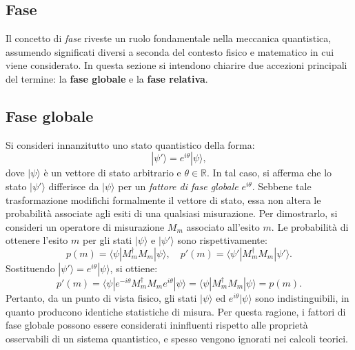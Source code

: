 \documentclass[a4paper,12pt]{report}
\theoremstyle{plain}
\begin{document}
\subsection{Fase}
Il concetto di \emph{fase} riveste un ruolo fondamentale nella meccanica quantistica, assumendo significati diversi a seconda del contesto fisico e matematico in cui viene considerato. In questa sezione si intendono chiarire due accezioni principali del termine: la \textbf{fase globale} e la \textbf{fase relativa}.
\subsection*{Fase globale}
Si consideri innanzitutto uno stato quantistico della forma:
\[
|\psi'\rangle = e^{i\theta}|\psi\rangle,
\]
dove \(|\psi\rangle\) è un vettore di stato arbitrario e \(\theta \in \mathbb{R}\). In tal caso, si afferma che lo stato \(|\psi'\rangle\) differisce da \(|\psi\rangle\) per un \emph{fattore di fase globale} \(e^{i\theta}\). Sebbene tale trasformazione modifichi formalmente il vettore di stato, essa non altera le probabilità associate agli esiti di una qualsiasi misurazione. Per dimostrarlo, si consideri un operatore di misurazione \(M_m\) associato all'esito \(m\). Le probabilità di ottenere l'esito \(m\) per gli stati \(|\psi\rangle\) e \(|\psi'\rangle\) sono rispettivamente:
\[
p(m) = \langle \psi | M_m^\dagger M_m | \psi \rangle, \quad
p'(m) = \langle \psi' | M_m^\dagger M_m | \psi' \rangle.
\]
Sostituendo \(|\psi'\rangle = e^{i\theta}|\psi\rangle\), si ottiene:
\[
p'(m) = \langle \psi | e^{-i\theta} M_m^\dagger M_m e^{i\theta} | \psi \rangle = \langle \psi | M_m^\dagger M_m | \psi \rangle = p(m).
\]
Pertanto, da un punto di vista fisico, gli stati \(|\psi\rangle\) ed \(e^{i\theta}|\psi\rangle\) sono indistinguibili, in quanto producono identiche statistiche di misura. Per questa ragione, i fattori di fase globale possono essere considerati ininfluenti rispetto alle proprietà osservabili di un sistema quantistico, e spesso vengono ignorati nei calcoli teorici.
\end{document}
